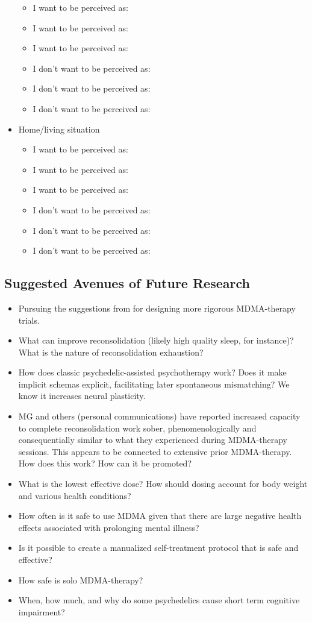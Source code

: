 \documentclass[12pt,letterpaper]{article}
\begin{document}
\begin{itemize}
\begin{itemize}
        \item I want to be perceived as:
        \item I want to be perceived as:
        \item I want to be perceived as:
        \item I don't want to be perceived as:
        \item I don't want to be perceived as:
        \item I don't want to be perceived as:
    \end{itemize}
    \item Home/living situation
    \begin{itemize}
        \item I want to be perceived as:
        \item I want to be perceived as:
        \item I want to be perceived as:
        \item I don't want to be perceived as:
        \item I don't want to be perceived as:
        \item I don't want to be perceived as:
    \end{itemize}
\end{itemize}
\subsection{Suggested Avenues of Future Research}
\begin{itemize}
    \item Pursuing the suggestions from \textcite{adayMethodologicalRigor} for designing more rigorous MDMA-therapy trials.
    \item What can improve reconsolidation (likely high quality sleep, for instance)? What is the nature of reconsolidation exhaustion?
    \item How does classic psychedelic-assisted psychotherapy work? Does it make implicit schemas explicit, facilitating later spontaneous mismatching? We know it increases neural plasticity.
    \item MG and others (personal communications) have reported increased capacity to complete reconsolidation work sober, phenomenologically and consequentially similar to what they experienced during MDMA-therapy sessions. This appears to be connected to extensive prior MDMA-therapy. How does this work? How can it be promoted?
    \item What is the lowest effective dose? How should dosing account for body weight and various health conditions?
    \item How often is it safe to use MDMA given that there are large negative health effects associated with prolonging mental illness?
    \item Is it possible to create a manualized self-treatment protocol that is safe and effective?
    \item How safe is solo MDMA-therapy?
    \item When, how much, and why do some psychedelics cause short term cognitive impairment?
\end{itemize}
\end{document}
